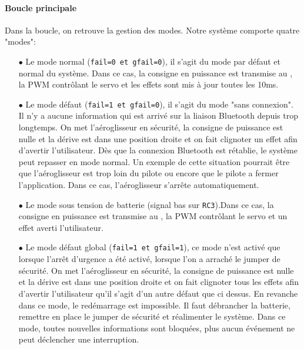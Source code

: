 			\paragraph{Boucle principale} Dans la boucle, on retrouve la gestion des modes. Notre système comporte quatre "modes":
			\begin{itemize}
			\item[$\bullet$] Le mode normal (\texttt{fail=0 et gfail=0}), il s'agit du mode par défaut et normal du système. Dans ce cas, la consigne en puissance est transmise au \dspic, la PWM contrôlant le servo et les effets sont mis à jour toutes les 10ms.
			\item[$\bullet$] Le mode défaut (\texttt{fail=1 et gfail=0}), il s'agit du mode "sans connexion". Il n'y a aucune information qui est arrivé sur la liaison Bluetooth depuis trop longtemps. On met l'aéroglisseur en sécurité, la consigne de puissance est nulle et la dérive est dans une position droite et on fait clignoter un effet afin d'avertir l'utilisateur. Dès que la connexion Bluetooth est rétablie, le système peut repasser en mode normal. Un exemple de cette situation pourrait être que l'aéroglisseur est trop loin du pilote ou encore que le pilote a fermer l'application. Dans ce cas, l'aéroglisseur s'arrête automatiquement.
			\item[$\bullet$] Le mode sous tension de batterie (signal bas sur \texttt{RC3}).Dans ce cas, la consigne en puissance est transmise au \dspic, la PWM contrôlant le servo et un effet averti l'utilisateur.
			\item[$\bullet$] Le mode défaut global (\texttt{fail=1 et gfail=1}), ce mode n'est activé que lorsque l'arrêt d'urgence a été activé, lorsque l'on a arraché le jumper de sécurité. On met l'aéroglisseur en sécurité, la consigne de puissance est nulle et la dérive est dans une position droite et on fait clignoter tous les effets afin d'avertir l'utilisateur qu'il s'agit d'un autre défaut que ci dessus. En revanche dans ce mode, le redémarrage est impossible. Il faut débrancher la batterie, remettre en place le jumper de sécurité et réalimenter le système. Dans ce mode, toutes nouvelles informations sont bloquées, plus aucun événement ne peut déclencher une interruption. 
			\end{itemize}
			
			
